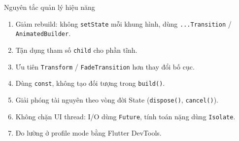 \documentclass[aspectratio=169,10pt]{beamer}
\begin{document}
\begin{frame}{Nguyên tắc quản lý hiệu năng}
  \begin{enumerate}
    \item Giảm rebuild: không \texttt{setState} mỗi khung hình, dùng \texttt{...Transition} / \texttt{AnimatedBuilder}.
    \item Tận dụng tham số \texttt{child} cho phần tĩnh.
    \item Ưu tiên \texttt{Transform} / \texttt{FadeTransition} hơn thay đổi bố cục.
    \item Dùng \texttt{const}, không tạo đối tượng trong \texttt{build()}.
    \item Giải phóng tài nguyên theo vòng đời State (\texttt{dispose()}, \texttt{cancel()}).
    \item Không chặn UI thread: I/O dùng \texttt{Future}, tính toán nặng dùng \texttt{Isolate}.
    \item Đo lường ở profile mode bằng Flutter DevTools.
  \end{enumerate}
\end{frame}
 
\end{document}
